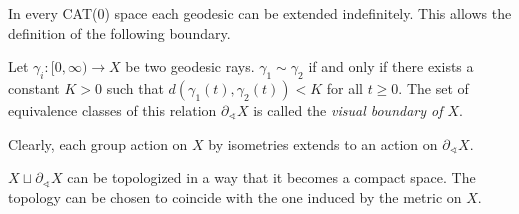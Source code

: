 


In every CAT(0) space each geodesic can be extended indefinitely. This allows the definition of the following boundary.

\begin{defin}
  Let \(\gamma_i \colon [0, \infty) \to X\) be two geodesic rays. \(\gamma_1 \sim \gamma_2\) if and only if there exists a constant \(K > 0 \) such that \(d(\gamma_1(t), \gamma_2(t)) < K\) for all \(t \geq 0\). The set of equivalence classes of this relation \(\partial_\sphericalangle X\) is called the \emph{visual boundary of \(X\)}.

  Clearly, each group action on \(X\) by isometries extends to an action on \(\partial_\sphericalangle X\).
\end{defin}

\begin{rem}
  \(X \sqcup \partial_{\sphericalangle}X\) can be topologized in a way that it becomes a compact space. The topology can be chosen to coincide with the one induced by the metric on \(X\). 
\end{rem}

